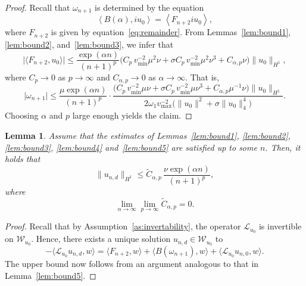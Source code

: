 \documentclass[a4paper,reqno,twoside]{amsart}
\numberwithin{equation}{section}
\newtheorem{lemma}[theorem]{Lemma}
\theoremstyle{definition}
\newcommand{\<}{\ensuremath \leq}
\renewcommand{\>}{\ensuremath \geq}
\begin{document}
\begin{proof}
    Recall that $\omega_{n+1}$ is determined by the equation
    \begin{equation}\label{eq:omega_projection}
        \left\langle B(\alpha),
        i u_0  \right\rangle
        = \left\langle
         F_{n+2}
         i u_0 \right\rangle,
    \end{equation}
    where $F_{n+2}$ is given by equation~\eqref{eq:remainder}.
    From Lemmas~\ref{lem:bound1}, \ref{lem:bound2}, and~\ref{lem:bound3}, we infer that
    \begin{equation}
        \lvert \langle F_{n+2}, u_0 \rangle \rvert
        \leq \frac{\exp(\alpha n)}{(n+1)^p}
        \bigl(
          C_p \, v_{\min}^{-2} \mu^2 \nu
          + \sigma C_p \, v_{\min}^{-2} \mu^2 \nu^3
          + C_{\alpha,p} \nu
        \bigr)
        \lVert u_0 \rVert_{H^1},
    \end{equation}
    where $C_p \to 0$ as $p \to \infty$ and $C_{\alpha,p} \to 0$ as $\alpha \to \infty$.
    That is,
    \begin{equation}
        \lvert \omega_{n+1} \rvert
        \leq \frac{\mu \exp(\alpha n)}{(n+1)^p} \cdot
        \frac{
          \bigl(
            C_p \, v_{\min}^{-2} \mu \nu
            + \sigma C_p \, v_{\min}^{-2} \mu \nu^3
            + C_{\alpha,p} \mu^{-1} \nu
          \bigr) \lVert u_0 \rVert_{H^1}
        }{
          2 \omega_1 v_{\max}^{-2}
          \bigl( \lVert u_0 \rVert^2 + \sigma \lVert u_0 \rVert_4^4 \bigr)
        }.
    \end{equation}
    Choosing $\alpha$ and $p$ large enough yields the claim.
\end{proof}


\begin{lemma}\label{lem:bound6}
    Assume that the estimates of Lemmas~\ref{lem:bound1}, \ref{lem:bound2},
    \ref{lem:bound3}, \ref{lem:bound4} and~\ref{lem:bound5} are satisfied up to some $n$.
    Then, it holds that
    \begin{equation}
        \lVert u_{n,d} \rVert_{H^1}
        \leq \widetilde{C}_{\alpha,p} \, \frac{\nu \exp(\alpha n)}{(n+1)^p},
    \end{equation}
    where
    \begin{equation}
        \lim_{\alpha \to \infty} \lim_{p \to \infty} \widetilde{C}_{\alpha,p} = 0.
    \end{equation}
\end{lemma}

\begin{proof}
    Recall that by Assumption~\ref{as:invertability}, the operator $\mathcal{L}_{u_0}$ is invertible on $\mathcal{W}_{u_0}$.
    Hence, there exists a unique solution $u_{n,d} \in \mathcal{W}_{u_0}$ to
    \begin{equation}
        -\langle \mathcal{L}_{u_0} u_{n,d}, w \rangle
        = \langle F_{n+2}, w \rangle
          + \langle B(\omega_{n+1}), w \rangle
          + \langle \mathcal{L}_{u_0} u_{n,0}, w \rangle.
    \end{equation}
    The upper bound now follows from an argument analogous to that in
    Lemma~\ref{lem:bound5}.
\end{proof}
\end{document}
